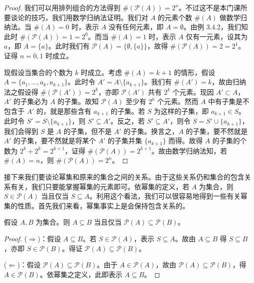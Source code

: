 \begin{proof}
我们可以用排列组合的方法得到 $\#(\mathcal{P}(A)) = 2^n$。不过这不是本门课所要谈论的技巧，我们用数学归纳法证明。我们对 $A$ 的元素个数 $\#(A)$ 做数学归纳法。当 $\#(A) = 0$ 时，表示 $A$ 没有任何元素，即 $A = \emptyset$。由例 3.4.2，我们知此时 $\#(\mathcal{P}(A)) = 1 = 2^0$。而当 $\#(A) = 1$ 时，表示 $A$ 仅有一元素，设其为 $a$，即 $A = \{a\}$。此时我们有 $\mathcal{P}(A) = \{\emptyset, \{a\}\}$，故得 $\#(\mathcal{P}(A)) = 2 = 2^1$。证得 $n = 0, 1$ 时成立。

现假设当集合的个数为 $k$ 时成立。考虑 $\#(A) = k+1$ 的情形，假设 $A = \{a_1, \dots, a_k, a_{k+1}\}$。此时令 $A' = A \setminus \{a_{k+1}\}$。我们有 $\#(A') = k$，故由归纳法之假设得 $\#(\mathcal{P}(A')) = 2^k$，亦即 $\mathcal{P}(A')$ 共有 $2^k$ 个元素。现因 $A' \subset A$，$A'$ 的子集必为 $A$ 的子集。故知 $\mathcal{P}(A)$ 至少有 $2^k$ 个元素。然而 $A$ 中有子集是不包含于 $A'$ 的，就是那些含有 $a_{k+1}$ 的子集。若 $S$ 为这样的子集，即 $a_{k+1} \in S$。此时令 $S' = S \setminus \{a_{k+1}\}$，则 $S' \subseteq A'$。反之，若 $S' \subseteq A'$，则令 $S = S' \cup \{a_{k+1}\}$，我们会得到 $S$ 是 $A$ 的子集，但不是 $A'$ 的子集。换言之，$A$ 的子集，要不然就是 $A'$ 的子集，要不然就是将某个 $A'$ 的子集并集 $\{a_{k+1}\}$ 而得。故得 $A$ 的子集的个数为 $2^k + 2^k = 2^{k+1}$，证得 $\#(\mathcal{P}(A)) = 2^{k+1}$。故由数学归纳法知，若 $\#(A) = n$，则 $\#(\mathcal{P}(A)) = 2^n$。
\end{proof}

接下来我们要谈论幂集和原来的集合之间的关系。由于这些关系仍和集合的包含关系有关，我们只要能掌握幂集的元素即可。依幂集的定义，若 $A$ 为集合，则 $S \in \mathcal{P}(A)$ 当且仅当 $S \subseteq A$。利用这个看法，我们可以很容易地得到一些有关幂集的性质。首先我们来看，幂集事实上是会保持包含关系的。

\begin{proposition}
假设 $A, B$ 为集合。则 $A \subseteq B$ 当且仅当 $\mathcal{P}(A) \subseteq \mathcal{P}(B)$。
\end{proposition}

\begin{proof}
($\Rightarrow$)：假设 $A \subseteq B$。若 $S \in \mathcal{P}(A)$，表示 $S \subseteq A$。故由 $A \subseteq B$ 得 $S \subseteq B$，亦即 $S \in \mathcal{P}(B)$。得证 $\mathcal{P}(A) \subseteq \mathcal{P}(B)$。

($\Leftarrow$)：假设 $\mathcal{P}(A) \subseteq \mathcal{P}(B)$。由于 $A \in \mathcal{P}(A)$，故由 $\mathcal{P}(A) \subseteq \mathcal{P}(B)$，得 $A \in \mathcal{P}(B)$。依幂集之定义，此即表示 $A \subseteq B$。
\end{proof}

